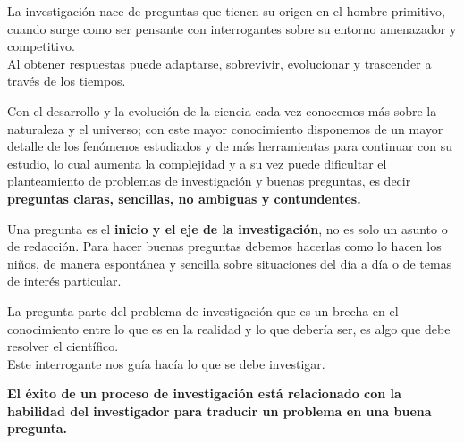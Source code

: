 \documentclass[
	11pt, %
]{beamer}
\begin{document}

\begin{frame}
  
  La investigación nace de preguntas que tienen su origen en el hombre primitivo, cuando surge como ser pensante con interrogantes sobre su entorno amenazador y competitivo.\\
  \bigskip %
  Al obtener respuestas puede adaptarse, sobrevivir, evolucionar y trascender a través de los tiempos.

  \bigskip %

  Con el desarrollo y la evolución de la ciencia cada vez conocemos más sobre la naturaleza y el universo; con este mayor conocimiento disponemos de un mayor detalle de los fenómenos estudiados y de más herramientas para continuar con su estudio, lo cual aumenta la complejidad y a su vez puede dificultar el planteamiento de problemas de investigación y buenas preguntas, es decir \textbf{preguntas claras, sencillas, no ambiguas y contundentes.}
  
  
\end{frame}

\begin{frame}
  Una pregunta es el \textbf{inicio y el eje de la investigación}, no es solo un asunto o de redacción. Para hacer buenas preguntas debemos hacerlas como lo hacen los niños, de manera espontánea y sencilla sobre situaciones del día a día o de temas de interés particular.\\

  \bigskip %
  
  La pregunta parte del problema de investigación que es un brecha en el conocimiento entre lo que es en la realidad y lo que debería ser, es algo que debe resolver el científico.\\
  Este interrogante nos guía hacía lo que se debe investigar.\\
  \bigskip %
  
  \textbf{El éxito de un proceso de investigación está relacionado con la habilidad del investigador para traducir un problema en una buena pregunta.}

\end{frame}
\end{document}
